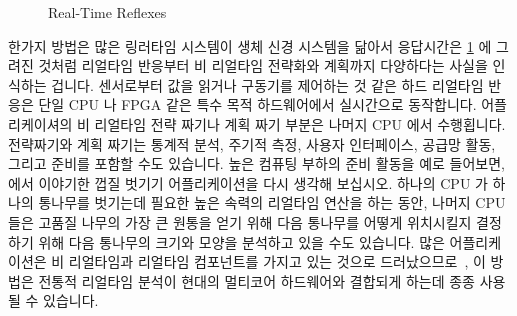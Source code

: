 \begin{figure}[tb]
\centering
{}
\caption{Real-Time Reflexes}
\label{fig:advsync:Real-Time Reflexes}
\end{figure}

한가지 방법은 많은 링러타임 시스템이 생체 신경 시스템을 닮아서 응답시간은
\cref{fig:advsync:Real-Time Reflexes} 에 그려진 것처럼 리얼타임 반응부터 비
리얼타임 전략화와 계획까지 다양하다는 사실을 인식하는 겁니다.
센서로부터 값을 읽거나 구동기를 제어하는 것 같은 하드 리얼타임 반응은 단일 CPU
나 FPGA 같은 특수 목적 하드웨어에서 실시간으로 동작합니다.
어플리케이셔의 비 리얼타임 전략 짜기나 계획 짜기 부분은 나머지 CPU 에서
수행횝니다.
전략짜기와 계획 짜기는 통계적 분석, 주기적 측정, 사용자 인터페이스, 공급망
활동, 그리고 준비를 포함할 수도 있습니다.
높은 컴퓨팅 부하의 준비 활동을 예로 들어보면,
에서 이야기한 껍질 벗기기 어플리케이션을 다시 생각해 보십시오.
하나의 CPU 가 하나의 통나무를 벗기는데 필요한 높은 속력의 리얼타임 연산을 하는
동안, 나머지 CPU 들은 고품질 나무의 가장 큰 원통을 얻기 위해 다음 통나무를
어떻게 위치시킬지 결정하기 위해 다음 통나무의 크기와 모양을 분석하고 있을 수도
있습니다.
많은 어플리케이션은 비 리얼타임과 리얼타임 컴포넌트를 가지고 있는 것으로
드러났으므로~\cite{RobertBerry2008IBMSysJ}, 이 방법은 전통적 리얼타임 분석이
현대의 멀티코어 하드웨어와 결합되게 하는데 종종 사용될 수 있습니다.

